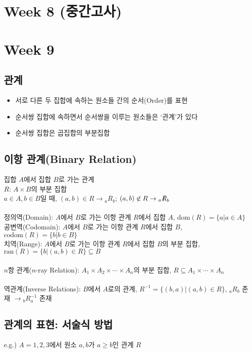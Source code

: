 \section{Week 8 (중간고사)}
\newpage
\section{Week 9}
\subsection{관계}
\begin{itemize}
    \item 서로 다른 두 집합에 속하는 원소들 간의 순서(Order)를 표현
    \item 순서쌍 집합에 속하면서 순서쌍을 이루는 원소들은 `관계'가 있다
    \item 순서쌍 집합은 곱집합의 부분집합
\end{itemize}

\subsection{이항 관계(Binary Relation)}
집합 $A$에서 집합 $B$로 가는 관계\\
$R$: $A \times B$의 부분 집합\\
$a \in A, b \in B$일 때, $(a, b) \in R \to {_aR_b}$; $(a, b) \not\in R \to {_a\slashed{R}_b}$
\\\\
정의역(Domain): $A$에서 $B$로 가는 이항 관계 $R$에서 집합 $A$, $\mathrm{dom}(R) = \{a | a \in A\}$\\
공변역(Codomain): $A$에서 $B$로 가는 이항 관계 $R$에서 집합 $B$, $\mathrm{codom}(R) = \{b | b \in B\}$\\
치역(Range): $A$에서 $B$로 가는 이항 관계 $R$에서 집합 $B$의 부분 집합, $\mathrm{ran}(R) = \{b | (a, b) \in R\} \subseteq B$
\\\\
$n$항 관계($n$-ray Relation): $A_1 \times A_2 \times \cdots \times A_n$의 부분 집합, $R \subseteq A_1 \times \cdots \times A_n$
\\\\
역관계(Inverse Relations): $B$에서 $A$로의 관계, $R^{-1} = \{(b, a) | (a, b) \in R\}$, $_aR_b$ 존재 $\to {_bR^{-1}_a}$ 존재

\subsection{관계의 표현: 서술식 방법}
e.g.) $A={1, 2, 3}$에서 원소 $a, b$가 $a \geq b$인 관계 $R$

